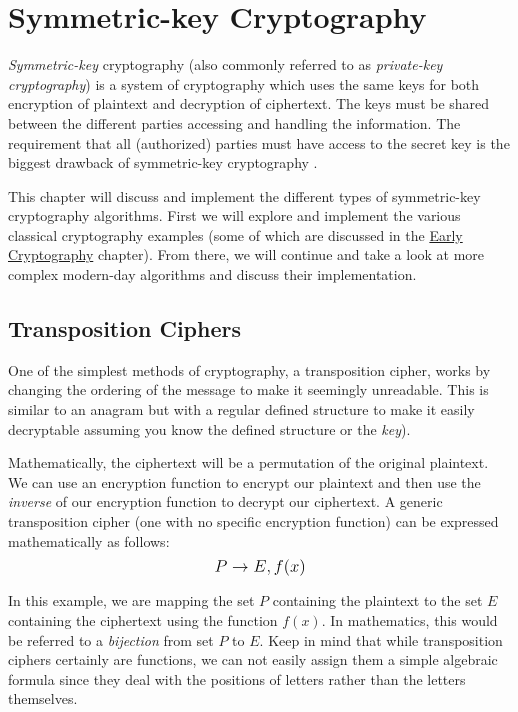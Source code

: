 \chapter{Symmetric-key Cryptography} %
\label{Symmetric-key Cryptography} %


\textit{Symmetric-key} cryptography (also commonly referred to as \textit{private-key cryptography}) is a system of cryptography which
uses the same keys for both encryption of plaintext and decryption of ciphertext. The keys must be shared between the different
parties accessing and handling the information. The requirement that all (authorized) parties must have access to the secret key
is the biggest drawback of symmetric-key cryptography \cite{wiki:symmetric_key_cryptography}.     

This chapter will discuss and implement the different types of symmetric-key cryptography algorithms. 
First we will explore and implement the various classical cryptography examples (some of which are discussed in the 
\hyperref[Early Cryptography]{Early Cryptography} chapter). From there, we will continue and take a look at more complex modern-day algorithms 
and discuss their implementation. 

\section{Transposition Ciphers}

One of the simplest methods of cryptography, a transposition cipher, works by changing the ordering of the message to make it seemingly unreadable.
This is similar to an anagram but with a regular defined structure to make it easily decryptable assuming you know the defined structure or the \textit{key}).   

Mathematically, the ciphertext will be a permutation of the original plaintext. We can use an encryption function to encrypt our plaintext and then use 
the \textit{inverse} of our encryption function to decrypt our ciphertext. A generic transposition cipher (one with no specific encryption function) 
can be expressed mathematically as follows: $$\mathlarger{P \rightarrow E, f(x)}$$

In this example, we are mapping the set $P$ containing the plaintext to the set $E$ containing the ciphertext using the function $f(x)$. 
In mathematics, this would be referred to a \textit{bijection} from set $P$ to $E$. Keep in mind that while transposition ciphers certainly
are functions, we can not easily assign them a simple algebraic formula since they deal with the positions of letters rather than the letters themselves.

